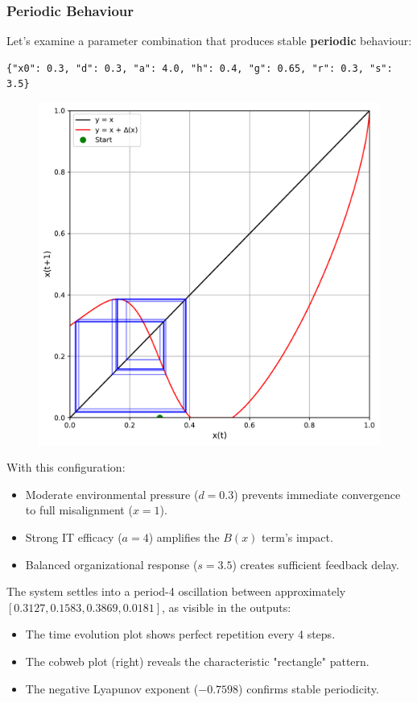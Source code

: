\documentclass[a4paper, 10pt]{article}
\begin{document}
\clearpage
\subsubsection{Periodic Behaviour}
Let's examine a parameter combination that produces stable \textbf{periodic} behaviour:

\begin{verbatim}
{"x0": 0.3, "d": 0.3, "a": 4.0, "h": 0.4, "g": 0.65, "r": 0.3, "s": 3.5}
\end{verbatim}

\begin{figure}
    \centering
    \includegraphics[width=0.45 \textwidth]{../images/int-cases/periodic-cobweb.pdf}
    \label{fig:periodic-cobweb}
\end{figure}

\RaggedRight

With this configuration:
\begin{itemize}
    \item Moderate environmental pressure ($d = 0.3$) prevents immediate convergence to full misalignment ($x=1$).
    \item Strong IT efficacy ($a = 4$) amplifies the $B(x)$ term's impact.
    \item Balanced organizational response ($s = 3.5$) creates sufficient feedback delay.
\end{itemize}

The system settles into a period-4 oscillation between approximately $[0.3127, 0.1583, 0.3869, 0.0181]$, as visible in the outputs:

\begin{itemize}
    \item The time evolution plot shows perfect repetition every 4 steps.
    \item The cobweb plot (right) reveals the characteristic "rectangle" pattern.
    \item The negative Lyapunov exponent ($-0.7598$) confirms stable periodicity.
\end{itemize}
\end{document}
